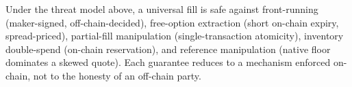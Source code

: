 \begin{property}
Under the threat model above, a universal fill is safe against
front-running (maker-signed, off-chain-decided), free-option extraction
(short on-chain expiry, spread-priced), partial-fill manipulation
(single-transaction atomicity), inventory double-spend (on-chain
reservation), and reference manipulation (native floor dominates a skewed
quote). Each guarantee reduces to a mechanism enforced on-chain, not to the
honesty of an off-chain party.
\end{property}

